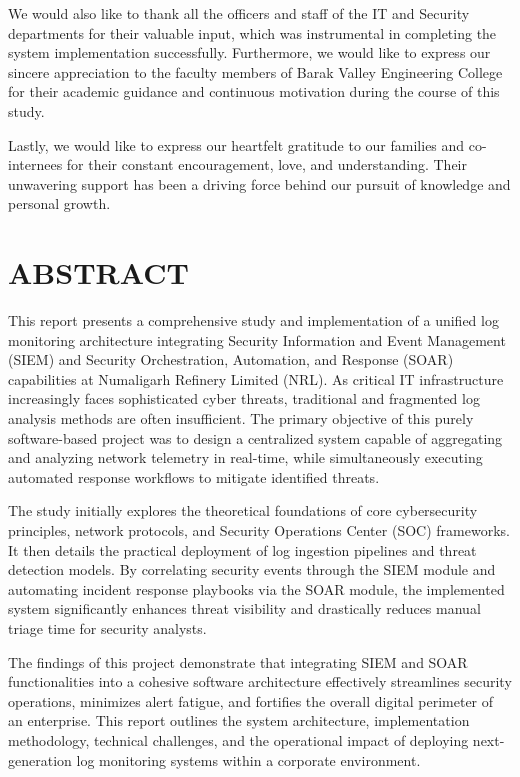 We would also like to thank all the officers and staff of the IT and Security departments for their valuable input, which was instrumental in completing the system implementation successfully. Furthermore, we would like to express our sincere appreciation to the faculty members of Barak Valley Engineering College for their academic guidance and continuous motivation during the course of this study.

Lastly, we would like to express our heartfelt gratitude to our families and co-internees for their constant encouragement, love, and understanding. Their unwavering support has been a driving force behind our pursuit of knowledge and personal growth.

\newpage
\chapter*{ABSTRACT}

This report presents a comprehensive study and implementation of a unified log monitoring architecture integrating Security Information and Event Management (SIEM) and Security Orchestration, Automation, and Response (SOAR) capabilities at Numaligarh Refinery Limited (NRL). As critical IT infrastructure increasingly faces sophisticated cyber threats, traditional and fragmented log analysis methods are often insufficient. The primary objective of this purely software-based project was to design a centralized system capable of aggregating and analyzing network telemetry in real-time, while simultaneously executing automated response workflows to mitigate identified threats.

The study initially explores the theoretical foundations of core cybersecurity principles, network protocols, and Security Operations Center (SOC) frameworks. It then details the practical deployment of log ingestion pipelines and threat detection models. By correlating security events through the SIEM module and automating incident response playbooks via the SOAR module, the implemented system significantly enhances threat visibility and drastically reduces manual triage time for security analysts.

The findings of this project demonstrate that integrating SIEM and SOAR functionalities into a cohesive software architecture effectively streamlines security operations, minimizes alert fatigue, and fortifies the overall digital perimeter of an enterprise. This report outlines the system architecture, implementation methodology, technical challenges, and the operational impact of deploying next-generation log monitoring systems within a corporate environment.

